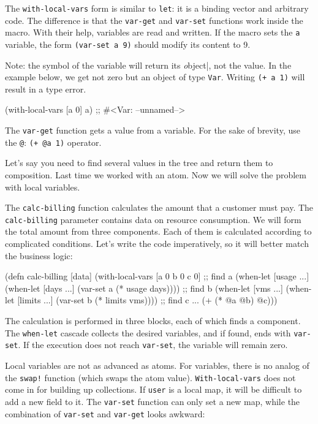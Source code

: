 The \verb|with-local-vars| form is similar to \verb|let|: it is a binding vector and arbitrary code. The difference is that the \verb|var-get| and \verb|var-set| functions work inside the macro.
With their help, variables are read and written.
If the macro sets the \verb|a| variable, the form \verb|(var-set a 9)| should modify its content to 9.

Note: the symbol of the variable will return its \emph object|, not the value.
In the example below, we get not zero but an object of type \verb|Var|. Writing \verb|(+ a 1)| will result in a type error.

\begin{clojure}
(with-local-vars [a 0] a)
;; #<Var: --unnamed-->
\end{clojure}

The \verb|var-get| function gets a value from a variable. For the sake of brevity, use the \verb|@|: \verb|(+ @a 1)| operator.

Let's say you need to find several values in the tree and return them to composition.
Last time we worked with an atom. Now we will solve the problem with local variables.

The \verb|calc-billing| function calculates the amount that a customer must pay.
The \verb|calc-billing| parameter contains data on resource consumption. We will form the total amount from three components. Each of them is calculated according to complicated conditions. Let's write the code imperatively, so it will better match the business logic:

\begin{clojure}
(defn calc-billing [data]
  (with-local-vars
    [a 0 b 0 c 0]
    ;; find a
    (when-let [usage ...]
      (when-let [days ...]
        (var-set a (* usage days))))
    ;; find b
    (when-let [vms ...]
      (when-let [limits ...]
        (var-set b (* limits vms))))
    ;; find c ...
    (+ (* @a @b) @c)))
\end{clojure}

The calculation is performed in three blocks, each of which finds a component.
The \verb|when-let| cascade collects the desired variables, and if found, ends with \verb|var-set|.
If the execution does not reach \verb|var-set|, the variable will remain zero.

Local variables are not as advanced as atoms.
For variables, there is no analog of the \verb|swap!| function (which swaps the atom value).
\verb|With-local-vars| does not come in for building up collections.
If \verb|user| is a local map, it will be difficult to add a new field to it.
The \verb|var-set| function can only set a new map, while the combination of \verb|var-set| and \verb|var-get| looks awkward:

